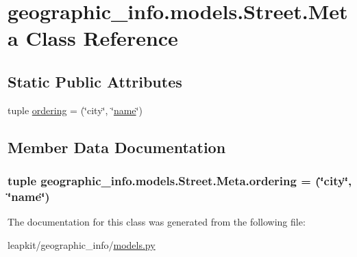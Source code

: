 \hypertarget{classgeographic__info_1_1models_1_1_street_1_1_meta}{\section{geographic\-\_\-info.\-models.\-Street.\-Meta Class Reference}
\label{classgeographic__info_1_1models_1_1_street_1_1_meta}
}
\subsection*{Static Public Attributes}
\begin{DoxyCompactItemize}
\item 
tuple \hyperlink{classgeographic__info_1_1models_1_1_street_1_1_meta_a4468fdbf323c743eb8dfd8bb9751c86b}{ordering} = (\char`\"{}city\char`\"{}, \char`\"{}\hyperlink{classgeographic__info_1_1models_1_1_street_a67ed0da0011cc008874b3b094483224b}{name}\char`\"{})
\end{DoxyCompactItemize}


\subsection{Member Data Documentation}
\hypertarget{classgeographic__info_1_1models_1_1_street_1_1_meta_a4468fdbf323c743eb8dfd8bb9751c86b}{
\subsubsection[{ordering}]{\setlength{\rightskip}{0pt plus 5cm}tuple geographic\-\_\-info.\-models.\-Street.\-Meta.\-ordering = (\char`\"{}city\char`\"{}, \char`\"{}{\bf name}\char`\"{})\hspace{0.3cm}{\ttfamily [static]}}}\label{classgeographic__info_1_1models_1_1_street_1_1_meta_a4468fdbf323c743eb8dfd8bb9751c86b}


The documentation for this class was generated from the following file\-:\begin{DoxyCompactItemize}
\item 
leapkit/geographic\-\_\-info/\hyperlink{geographic__info_2models_8py}{models.\-py}\end{DoxyCompactItemize}
